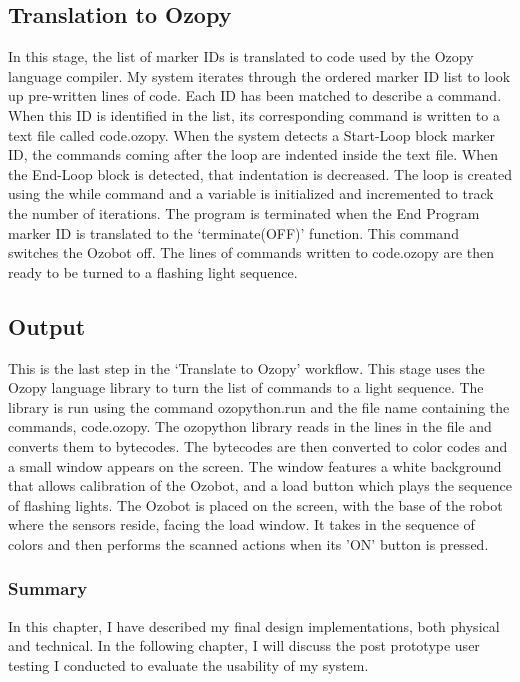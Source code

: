 \documentclass[oneside,%
                    author={Malak Hajji},
                    degree={BSc},
                    title={Designing An Accessible Computational Toolkit For Students},
                  subtitle={With Mixed Visual Abilities}]{dissertation}
\begin{document}
 
\subsection{Translation to Ozopy}
 
In this stage, the list of marker IDs is translated to code used by the Ozopy language compiler. My system iterates through the ordered marker ID list to look up pre-written lines of code. Each ID has been matched to describe a command. When this ID is identified in the list, its corresponding command is written to a text file called code.ozopy.  
When the system detects a Start-Loop block marker ID, the commands coming after the loop are indented inside the text file. When the End-Loop block is detected, that indentation is decreased. The loop is created using the while command and a variable is initialized and incremented to track the number of iterations. The program is terminated when the End Program marker ID is translated to the ‘terminate(OFF)’ function. This command switches the Ozobot off. 
The lines of commands written to code.ozopy are then ready to be turned to a flashing light sequence. 
 
\subsection{Output}  
This is the last step in the ‘Translate to Ozopy’ workflow. This stage uses the Ozopy language library to turn the list of commands to a light sequence. The library is run using the command ozopython.run and the file name containing the commands, code.ozopy. The ozopython library reads in the lines in the file and converts them to bytecodes. The bytecodes are then converted to color codes and a small window appears on the screen. The window features a white background that allows calibration of the Ozobot, and a load button which plays the sequence of flashing lights. The Ozobot is placed on the screen, with the base of the robot where the sensors reside, facing the load window. It takes in the sequence of colors and then performs the scanned actions when its 'ON' button is pressed.

\subsubsection{Summary}
In this chapter, I have described my final design implementations, both physical and technical. In the following chapter, I will discuss the post prototype user testing I conducted to evaluate the usability of my system.
\end{document}
